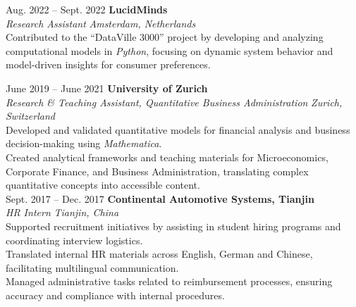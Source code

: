 \documentclass[a4paper,12pt]{article}
\makeatletter
\newenvironment{jobshort}[2]
    {
    \begin{tabularx}{\linewidth}{@{}l X r@{}}
    \textbf{#1} & \hfill &  #2 \\[3.75pt]
    \end{tabularx}
    }
    {
    }
\makeatother
\begin{document}
Aug. 2022 -- Sept. 2022 \hfill \textbf{LucidMinds} \\ %
\textit{Research Assistant} \hfill \textit{Amsterdam, Netherlands} \\
\textbullet Contributed to the “DataVille 3000” project by developing and analyzing computational models in \textit{Python}, focusing on dynamic system behavior and model-driven insights for consumer preferences.

June 2019 -- June 2021 \hfill \textbf{University of Zurich} \\
\textit{Research \& Teaching Assistant, Quantitative Business Administration} \hfill \textit{Zurich, Switzerland} \\
\textbullet Developed and validated quantitative models for financial analysis and business decision-making using \textit{Mathematica}. \\
\textbullet Created analytical frameworks and teaching materials for Microeconomics, Corporate Finance, and Business Administration, translating complex quantitative concepts into accessible content. \\


Sept. 2017 -- Dec. 2017 \hfill \textbf{Continental Automotive Systems, Tianjin} \\
\textit{HR Intern} \hfill \textit{Tianjin, China} \\
\textbullet Supported recruitment initiatives by assisting in student hiring programs and coordinating interview logistics. \\
\textbullet Translated internal HR materials across English, German and Chinese, facilitating multilingual communication. \\
\textbullet Managed administrative tasks related to reimbursement processes, ensuring accuracy and compliance with internal procedures. \\
\end{document}
